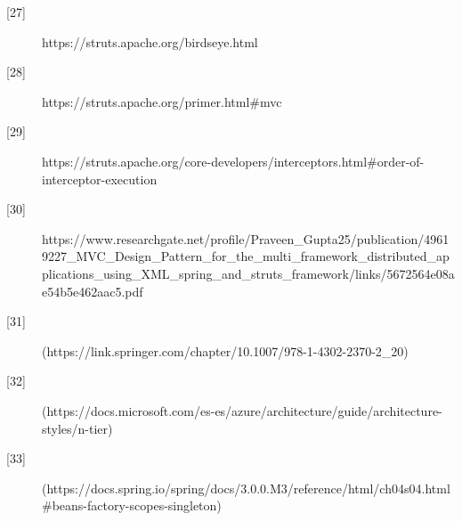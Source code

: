 \begin{description}
		\item[\hypertarget{b27}{[27]}] https://struts.apache.org/birdseye.html 
		
		\item[\hypertarget{b28}{[28]}] https://struts.apache.org/primer.html\#mvc
		
		\item[\hypertarget{b29}{[29]}]
		https://struts.apache.org/core-developers/interceptors.html\#order-of-interceptor-execution
		
		\item[\hypertarget{b30}{[30]}] 	https://www.researchgate.net/profile/Praveen\_Gupta25/publication/49619227\_MVC\_Design\_Pattern\_for\_the\_multi\_framework\_distributed\_applications\_using\_XML\_spring\_and\_struts\_framework/links/5672564e08ae54b5e462aac5.pdf
		
		\item[\hypertarget{b31}{[31]}] (https://link.springer.com/chapter/10.1007/978-1-4302-2370-2\_20)
		\item[\hypertarget{b32}{[32]}] (https://docs.microsoft.com/es-es/azure/architecture/guide/architecture-styles/n-tier)
		\item[\hypertarget{b33}{[33]}](https://docs.spring.io/spring/docs/3.0.0.M3/reference/html/ch04s04.html\#beans-factory-scopes-singleton)

\end{description}